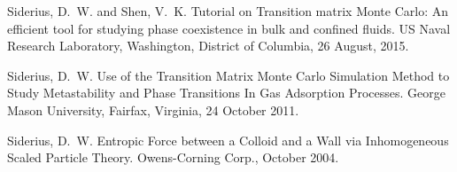 Siderius, D.~W. and Shen, V.~K. Tutorial on Transition matrix Monte Carlo: An efficient tool for studying phase coexistence in bulk and confined fluids. US Naval Research Laboratory, Washington, District of Columbia, 26 August, 2015.

Siderius, D.~W. Use of the Transition Matrix Monte Carlo Simulation Method to Study Metastability and Phase Transitions In Gas Adsorption Processes. George Mason University, Fairfax, Virginia, 24 October 2011.

Siderius, D.~W. Entropic Force between a Colloid and a Wall via Inhomogeneous Scaled Particle Theory. Owens-Corning Corp., October 2004.
